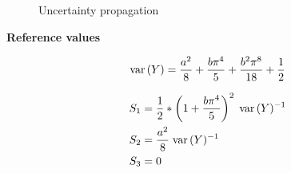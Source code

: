 \begin{frame}
\begin{figure}[htp]\centering\caption{Uncertainty propagation}
\end{figure}
\end{frame}
\begin{frame}\textbf{Reference values}\vspace{0.3cm}

\begin{align*}
	\mathrm{var}\thinspace(Y) = \frac{a^2}{8} + \frac{b \pi^4}{5} + \frac{b^2\pi^8}{18} + \frac{1}{2}
\end{align*}

\begin{align*}
S_1 & = \frac{1}{2} *  \left(1 + \frac{b\pi^4}{5}\right)^2 \; \mathrm{var}\thinspace(Y)^{-1} \\
S_2 & = \frac{a^2}{8} \; \mathrm{var}\thinspace(Y)^{-1} \\
S_3 & = 0
\end{align*}


\end{frame}
